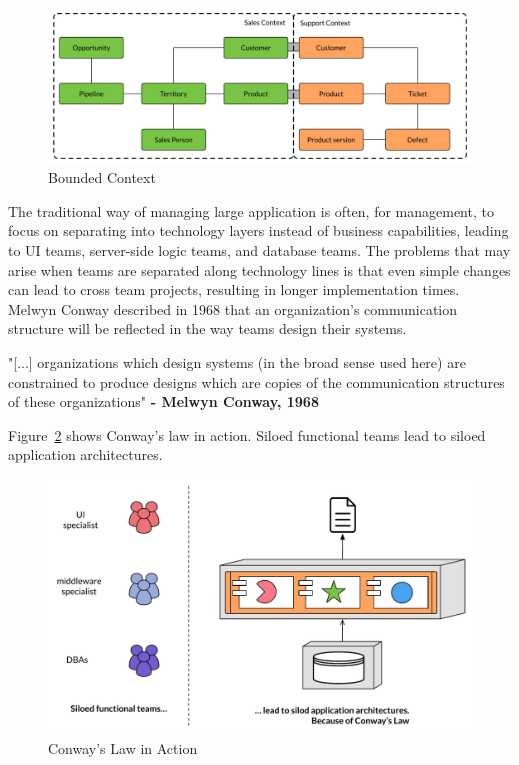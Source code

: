 \begin{figure}[H]
    \centering
    \includegraphics[width=\textwidth]{figures/bounded_context}
    \caption{Bounded Context \cite{boundedcontext2014fowler}}
    \label{fig:bounded_context}
\end{figure}

\noindent
The traditional way of managing large application is often, for management, to focus on separating into technology layers instead of business capabilities, leading to UI teams, server-side logic teams, and database teams. The problems that may arise when teams are separated along technology lines is that even simple changes can lead to cross team projects, resulting in longer implementation times. Melwyn Conway described in 1968 that an organization's communication structure will be reflected in the way teams design their systems. 

\begin{citat} []
"[...] organizations which design  systems (in the broad sense used here) are constrained to produce designs which are copies of the communication structures of these organizations" \textbf{- Melwyn Conway, 1968} \cite[p. 31]{conway1968law} 
\end{citat}


\noindent Figure~\ref{fig:conway} shows Conway's law in action. Siloed functional teams lead to siloed application architectures.
  

\begin{figure}[H]
    \centering
    \includegraphics[width=12cm]{figures/conways_law}
    \caption{Conway's Law in Action \cite[p. 5]{lewis2014microservices}}
    \label{fig:conway}
\end{figure}



